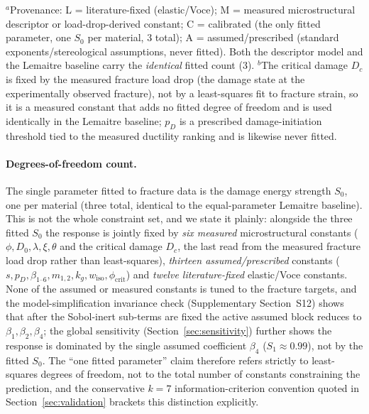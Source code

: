 \begin{table}[htbp]
\vspace{2pt}
\noindent\parbox{\textwidth}{\scriptsize $^{a}$Provenance: L = literature-fixed (elastic/Voce); M = measured microstructural descriptor or load-drop-derived constant; C = calibrated (the only fitted parameter, one $S_0$ per material, 3 total); A = assumed/prescribed (standard exponents/stereological assumptions, never fitted). Both the descriptor model and the Lemaitre baseline carry the \emph{identical} fitted count (3). $^{b}$The critical damage $D_c$ is fixed by the measured fracture load drop (the damage state at the experimentally observed fracture), not by a least-squares fit to fracture strain, so it is a measured constant that adds no fitted degree of freedom and is used identically in the Lemaitre baseline; $p_D$ is a prescribed damage-initiation threshold tied to the measured ductility ranking and is likewise never fitted.}
\end{table}

\paragraph{Degrees-of-freedom count.}
The single parameter fitted to fracture data is the damage energy strength $S_0$, one per material (three total, identical to the equal-parameter Lemaitre baseline). This is not the whole constraint set, and we state it plainly: alongside the three fitted $S_0$ the response is jointly fixed by \emph{six measured} microstructural constants ($\phi, D_0, \lambda, \xi, \theta$ and the critical damage $D_c$, the last read from the measured fracture load drop rather than least-squares), \emph{thirteen assumed/prescribed} constants ($s, p_D, \beta_{1\text{--}6}, m_{1,2}, k_g, w_{\mathrm{iso}}, \phi_{\mathrm{crit}}$) and \emph{twelve literature-fixed} elastic/Voce constants. None of the assumed or measured constants is tuned to the fracture targets, and the model-simplification invariance check (Supplementary Section~S12) shows that after the Sobol-inert sub-terms are fixed the active assumed block reduces to $\beta_1, \beta_2, \beta_4$; the global sensitivity (Section~\ref{sec:sensitivity}) further shows the response is dominated by the single assumed coefficient $\beta_4$ ($S_1 \approx 0.99$), not by the fitted $S_0$. The ``one fitted parameter'' claim therefore refers strictly to least-squares degrees of freedom, not to the total number of constants constraining the prediction, and the conservative $k=7$ information-criterion convention quoted in Section~\ref{sec:validation} brackets this distinction explicitly.

